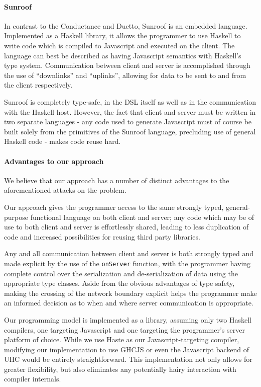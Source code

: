 \documentclass[preprint]{sigplanconf}
\begin{document}
\paragraph{Sunroof} In contrast to the Conductance and Duetto, Sunroof is an
embedded language. Implemented as a Haskell library, it allows the programmer
to use Haskell to write code which is compiled to Javascript and executed on
the client. The language can best be described as having Javascript semantics
with Haskell's type system. Communication between client and server is
accomplished through the use of ``downlinks'' and ``uplinks'', allowing for
data to be sent to and from the client respectively.

Sunroof is completely type-safe, in the DSL itself as well as in the
communication with the Haskell host. However, the fact that client and server
must be written in two separate languages - any code used to generate
Javascript must of course be built solely from the primitives of the Sunroof
language, precluding use of general Haskell code - makes code reuse hard.

\paragraph{Advantages to our approach} We believe that our approach has a
number of distinct advantages to the aforementioned attacks on the problem.

Our approach gives the programmer access to the same strongly typed,
general-purpose functional language on both client and server; any code which
may be of use to both client and server is effortlessly shared, leading to less
duplication of code and increased possibilities for reusing third party
libraries.

Any and all communication between client and server is both strongly typed
and made explicit by the use of the \lstinline!onServer! function, with the
programmer having complete control over the serialization and de-serialization
of data using the appropriate type classes. Aside from the obvious advantages
of type safety, making the crossing of the network boundary explicit helps the
programmer make an informed decision as to when and where server communication
is appropriate.

Our programming model is implemented as a library, assuming only two Haskell
compilers, one targeting Javascript and one targeting the programmer's server
platform of choice. While we use Haste as our Javascript-targeting compiler,
modifying our implementation to use GHCJS or even the Javascript backend of UHC
would be entirely straightforward. This implementation not only allows for
greater flexibility, but also eliminates any potentially hairy interaction with
compiler internals.
\end{document}
